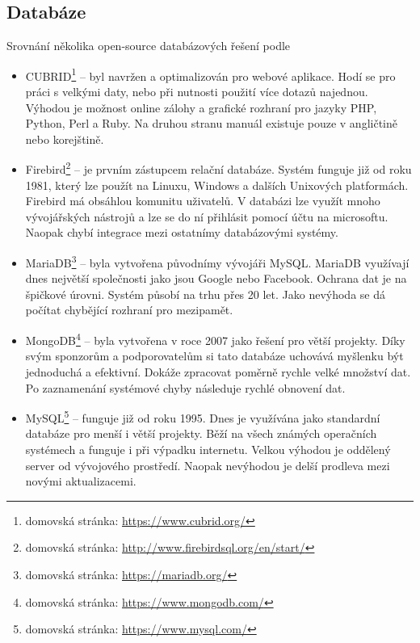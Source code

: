         \subsection{Databáze}
            Srovnání několika open-source databázových řešení podle \cite{database}\\
            \begin{itemize}
                \item CUBRID\footnote{domovská stránka: \url{https://www.cubrid.org/}} – byl navržen a optimalizován pro webové aplikace. Hodí se pro práci s velkými daty, nebo při nutnosti použití více dotazů najednou. Výhodou je možnost online zálohy a grafické rozhraní pro jazyky PHP, Python, Perl a Ruby. Na druhou stranu manuál existuje pouze v angličtině nebo korejštině.
                
                \item Firebird\footnote{domovská stránka: \url{http://www.firebirdsql.org/en/start/}} – je prvním zástupcem relační databáze. Systém funguje již od roku 1981, který lze použít na Linuxu, Windows a dalších Unixových platformách. Firebird má obsáhlou komunitu uživatelů. V databázi lze využít mnoho vývojářských nástrojů a lze se do ní přihlásit pomocí účtu na microsoftu. Naopak chybí integrace mezi ostatnímy databázovými systémy.
                
                \item MariaDB\footnote{domovská stránka: \url{https://mariadb.org/}} – byla vytvořena původnímy vývojáři MySQL. MariaDB využívají dnes největší společnosti jako jsou Google nebo Facebook. Ochrana dat je na špičkové úrovni. Systém působí na trhu přes 20 let. Jako nevýhoda se dá počítat chybějící rozhraní pro mezipamět.
                
                \item MongoDB\footnote{domovská stránka: \url{https://www.mongodb.com/}} – byla vytvořena v roce 2007 jako řešení pro větší projekty. Díky svým sponzorům a podporovatelům si tato databáze uchovává myšlenku být jednoduchá a efektivní. Dokáže zpracovat poměrně rychle velké množství dat. Po zaznamenání systémové chyby následuje rychlé obnovení dat.
                
                \item MySQL\footnote{domovská stránka: \url{https://www.mysql.com/}} – funguje již od roku 1995. Dnes je využívána jako standardní databáze pro menší i větší projekty. Běží na všech známých operačních systémech a funguje i při výpadku internetu. Velkou výhodou je oddělený server od vývojového prostředí. Naopak nevýhodou je delší prodleva mezi novými aktualizacemi.
                

\end{itemize}
